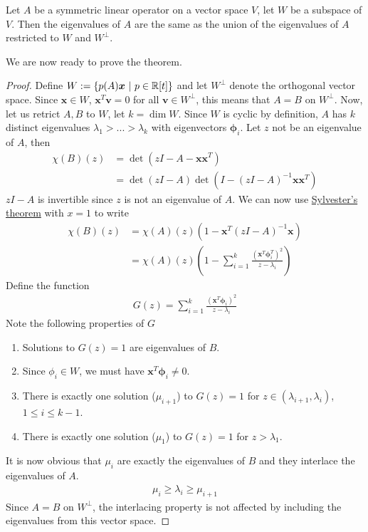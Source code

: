 \documentclass{math}
\renewcommand{\vec}[1]{\boldsymbol{#1}}
\begin{document}
\begin{lemma}
    Let $A$ be a symmetric linear operator on a vector space $V$, let $W$ be a subspace of $V$.
    Then the eigenvalues of $A$ are the same as the union of the eigenvalues of $A$ restricted to $W$ and $W^\perp$.
\end{lemma}

We are now ready to prove the theorem.

\begin{proof}
    Define $W := \setc{p(A)\vec{x}}{p \in \mathbb{R}[t]}$ and let $W^\perp$ denote the orthogonal vector space.
    Since $\vec{x} \in W$, $\vec{x}^T \vec{v} = 0$ for all $\vec{v} \in W^\perp$, this means that $A = B$ on $W^\perp$.
    Now, let us retrict $A, B$ to $W$, let $k = \dim W$.
    Since $W$ is cyclic by definition, $A$ has $k$ distinct eigenvalues $\lambda_1 > ... > \lambda_k$ with eigenvectors $\vec{\phi}_i$.
    Let $z$ not be an eigenvalue of $A$, then
    \begin{align*}
        \chi(B)(z) &= \det(zI - A - \vec{x}\vec{x}^T) \\
        &= \det(zI - A) \det(I - (zI - A)^{-1}\vec{x}\vec{x}^T)
    \end{align*}
    $zI-A$ is invertible since $z$ is not an eigenvalue of $A$. We can now use \hyperref[lemma:sylvester]{Sylvester's theorem} with $x = 1$ to write
    \begin{align*}
        \chi(B)(z) &= \chi(A)(z)(1 - \vec{x}^T (zI - A)^{-1} \vec{x}) \\
        &= \chi(A)(z)\left(1 - \sum_{i = 1}^k \frac{(\vec{x}^T \vec{\phi}_i^T)^2}{z - \lambda_i}\right)
    \end{align*}
    Define the function
    \begin{align*}
        G(z) = \sum_{i=1}^k \frac{(\vec{x}^T \vec{\phi}_i)^2}{z - \lambda_i}
    \end{align*}
    Note the following properties of $G$
    \begin{enumerate}
        \item Solutions to $G(z) = 1$ are eigenvalues of $B$.
        \item Since $\phi_i \in W$, we must have $\vec{x}^T \vec{\phi}_i \neq 0$. 
        \item There is exactly one solution ($\mu_{i + 1}$) to $G(z) = 1$ for $z \in (\lambda_{i + 1}, \lambda_{i})$, $1 \leq i \leq k - 1$.
        \item There is exactly one solution ($\mu_1$) to $G(z) = 1$ for $z > \lambda_1$.
    \end{enumerate}
    It is now obvious that $\mu_i$ are exactly the eigenvalues of $B$ and they interlace the eigenvalues of $A$.
    \begin{align*}
        \mu_i \geq \lambda_i \geq \mu_{i + 1}
    \end{align*}
    Since $A=B$ on $W^\perp$, the interlacing property is not affected by including the eigenvalues from this vector space.
\end{proof}
\end{document}
